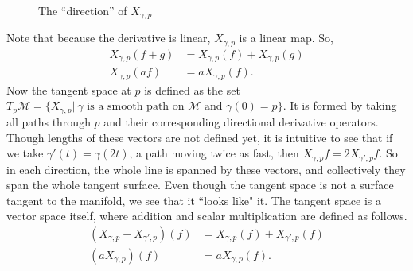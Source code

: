 \documentclass{article}
\begin{document}
\begin{figure}[h]
    \centering
    \caption{The ``direction'' of $X_{\gamma, p}$}
\end{figure}
\pagebreak
\noindent Note that because the derivative is linear, $X_{\gamma, p}$ is a linear map. So,
\begin{align*}
    X_{\gamma, p}(f + g) &= X_{\gamma, p}(f) + X_{\gamma, p}(g) \\
    X_{\gamma, p}(af) &= aX_{\gamma, p}(f).
\end{align*}
Now the tangent space at $p$  is defined as the set $T_p\mathcal{M} = \{X_{\gamma,p} | \  \gamma \text{ is a smooth path on \(\mathcal{M}\) and } \gamma (0) = p\}$. It is formed by taking all paths through $p$ and their corresponding directional derivative operators. Though lengths of these vectors are not defined yet, it is intuitive to see that if we take $\gamma'(t) = \gamma(2t)$, a path moving twice as fast, then $X_{\gamma, p}f = 2X_{\gamma', p}f$. So in each direction, the whole line is spanned by these vectors, and collectively they span the whole tangent surface. Even though the tangent space is not a surface tangent to the manifold, we see that it ``looks like" it. The tangent space is a vector space itself, where addition and scalar multiplication are defined as follows.
\begin{align*}
    (X_{\gamma, p} + X_{\gamma', p})(f) &= X_{\gamma, p}(f) + X_{\gamma', p}(f) \\
    (aX_{\gamma, p})(f) &= aX_{\gamma, p}(f).
\end{align*}
\end{document}
